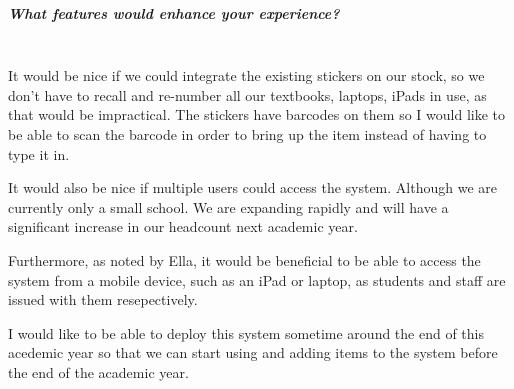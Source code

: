 \documentclass[../../../main.tex]{subfiles}
\begin{document}
\subparagraph{What features would enhance your experience?}

\noindent \\ It would be nice if we could integrate the existing stickers on our stock, so we don't have to recall and re-number all our textbooks, laptops, iPads in use, as that would be impractical.
The stickers have barcodes on them so I would like to be able to scan the barcode in order to bring up the item instead of having to type it in.

It would also be nice if multiple users could access the system.
Although we are currently only a small school. We are expanding rapidly and will have a significant increase in our headcount next academic year.

Furthermore, as noted by Ella, it would be beneficial to be able to access the system from a mobile device, such as an iPad or laptop, as students and staff are issued with them resepectively.

I would like to be able to deploy this system sometime around the end of this acedemic year so that we can start using and adding items to the system before the end of the academic year.
\end{document}

